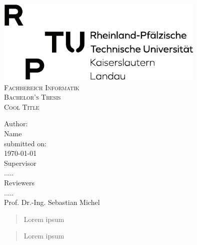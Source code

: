 \documentclass[a4paper]{report}
\author{}
\date{\today}
\begin{document}
\pagestyle{empty}
\begin{titlepage}
\begin{center}
	\includegraphics[width=10cm,clip,trim=0 0 0 0\textwidth]{rptu}\\[2cm]
  \textsc{\large Fachbereich Informatik}\\[1.5cm]
	\vfill
  \textsc{\Large Bachelor's Thesis}\\[0.5cm]
{
  \linespread{1.0}\selectfont
{\LARGE   \textsc{Cool Title}\\[2cm]}
}

  { \Large
  Author:\\
	Name\\[2cm]
  {\small submitted on: \\
  \today}
  }\\[1cm]

  Supervisor\\
.....\\[2cm]
  Reviewers\\
.....\\
  Prof. Dr.-Ing. Sebastian Michel\\

  
\end{center}
\end{titlepage}

%
\cleardoublepage


\begin{abstract}
Lorem ipsum
\end{abstract}

\cleardoublepage

\begin{abstract}
Lorem ipsum
\end{abstract}

\tableofcontents
\thispagestyle{empty}
\listoffigures
\thispagestyle{empty}
\begingroup
\thispagestyle{empty}
\let\clearpage\relax
\vspace{3cm}
\listofalgorithms
\let\clearpage\relax
\vspace{3cm}
\listoftables
\endgroup
\thispagestyle{empty}
\end{document}
